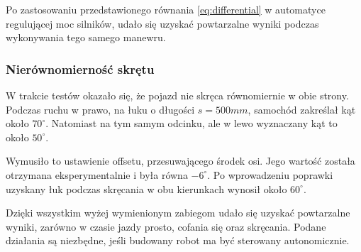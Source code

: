         Po zastosowaniu przedstawionego równania \eqref{eq:differential} w automatyce regulującej moc silników, udało się uzyskać powtarzalne wyniki podczas wykonywania tego samego manewru.

        \subsubsection{Nierównomierność skrętu}
        \label{subsec:nierownomiernosc_skretu}
            W trakcie testów okazało się, że pojazd nie skręca równomiernie w obie strony.
%
            Podczas ruchu w prawo, na łuku o długości $s = 500mm$, samochód zakreślał kąt około $70^\circ$.
            Natomiast na tym samym odcinku, ale w lewo wyznaczany kąt to około $50^\circ$.

            Wymusiło to ustawienie offsetu, przesuwającego środek osi.
            Jego wartość została otrzymana eksperymentalnie i była równa $-6^\circ$.
            Po wprowadzeniu poprawki uzyskany łuk podczas skręcania w obu kierunkach wynosił około $60^\circ$.



    Dzięki wszystkim wyżej wymienionym zabiegom udało się uzyskać powtarzalne wyniki, zarówno w czasie jazdy prosto, cofania się oraz skręcania.
    Podane działania są niezbędne, jeśli budowany robot ma być sterowany autonomicznie.

